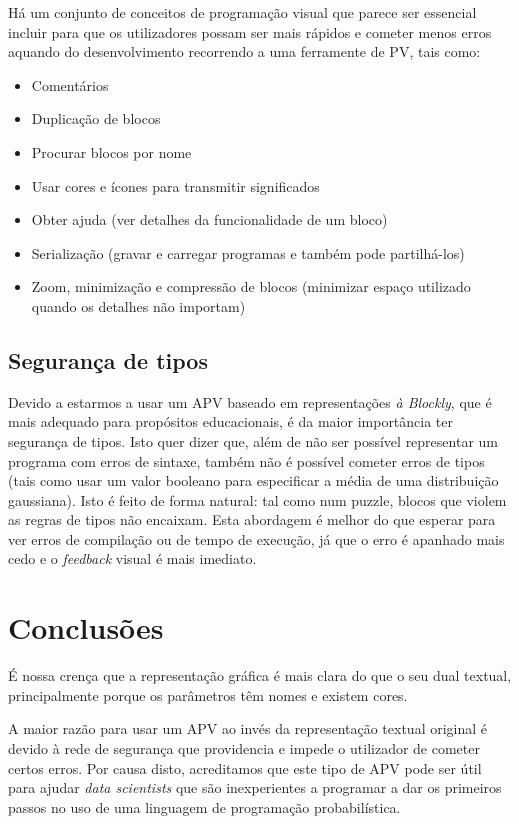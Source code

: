\documentclass[9pt,a4paper]{extarticle}
\begin{document}
\begin{multicols}{2}
Há um conjunto de conceitos de programação visual que parece ser essencial
incluir para que os utilizadores possam ser mais rápidos e cometer menos
erros aquando do desenvolvimento recorrendo a uma ferramente de PV, tais como:

\begin{itemize}
  \item Comentários
  \item Duplicação de blocos
  \item Procurar blocos por nome
  \item Usar cores e ícones para transmitir significados
  \item Obter ajuda (ver detalhes da funcionalidade de um bloco)
  \item Serialização (gravar e carregar programas e também pode partilhá-los)
  \item Zoom, minimização e compressão de blocos (minimizar espaço utilizado quando os detalhes não importam)
\end{itemize}

\subsection{Segurança de tipos}

Devido a estarmos a usar um APV baseado em representações \textit{à Blockly},
que é mais adequado para propósitos educacionais, é da maior importância ter
segurança de tipos. Isto quer dizer que, além de não ser possível representar
um programa com erros de sintaxe, também não é possível cometer erros de tipos
(tais como usar um valor booleano para especificar a média de uma distribuição
gaussiana).
Isto é feito de forma natural: tal como num puzzle, blocos que violem as regras
de tipos não encaixam. Esta abordagem é melhor do que esperar para ver erros
de compilação ou de tempo de execução, já que o erro é apanhado mais cedo e o
\textit{feedback} visual é mais imediato.

\section{Conclusões}\label{sec:conclui}

É nossa crença que a representação gráfica é mais clara do que o seu dual textual,
principalmente porque os parâmetros têm nomes e existem cores.

A maior razão para usar um APV ao invés da representação textual original é devido
à rede de segurança que providencia e impede o utilizador de cometer certos erros.
Por causa disto, acreditamos que este tipo de APV pode ser útil para ajudar
\textit{data scientists} que são inexperientes a programar a dar os primeiros passos
no uso de uma linguagem de programação probabilística.


\end{multicols}
\end{document}

